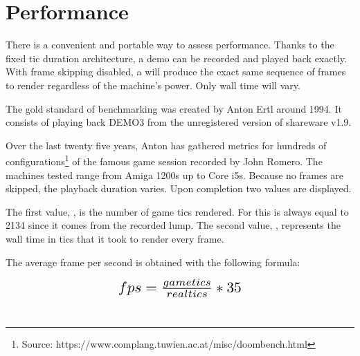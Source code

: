 \vspace{-40pt}
\section{Performance} \label{performances}
There is a convenient and portable way to assess performance. Thanks to the fixed tic duration architecture, a demo can be recorded and played back exactly. With frame skipping disabled, a  will produce the exact same sequence of frames to render regardless of the machine's power. Only wall time will vary.\\
\par
The gold standard of \doom{} benchmarking was created by Anton Ertl around 1994. It consists of playing back DEMO3 from the unregistered version of \doom{} shareware v1.9.\\
\par
{}
\par
Over the last twenty five years, Anton has gathered metrics for hundreds of configurations\footnote{Source: https://www.complang.tuwien.ac.at/misc/doombench.html} of the famous game session recorded by John Romero. The machines tested range from Amiga 1200s up to Core i5s. Because no frames are skipped, the playback duration varies. Upon completion two values are displayed.\\
\par
{}
\par

The first value, , is the number of game tics rendered. For  this is always equal to 2134 since it comes from the recorded lump. The second value, , represents the wall time in tics that it took to render every frame.\\
\par
 The average frame per second is obtained with the following formula:\\
 \par 
\begin{equation*}
\resizebox{.4 \textwidth}{!} 
{
 $ fps = \frac{gametics}{realtics} * 35 $ 
 }
 \end{equation*}\\


